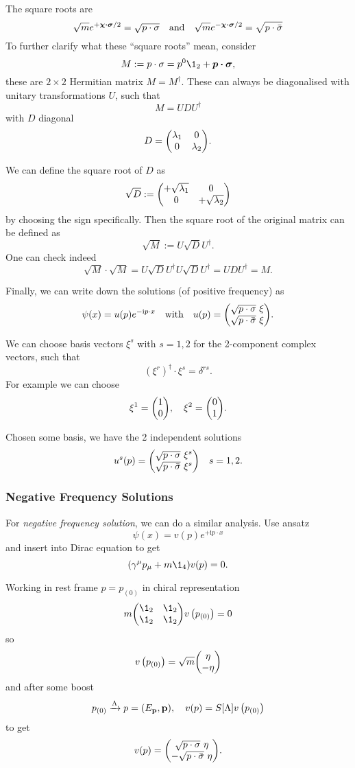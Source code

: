 \documentclass[a4paper,11pt]{article}
\begin{document}
	The square roots are
	\[
		\sqrt{m} e ^{+ \bm \chi \vdot \bm \sigma / 2} = \sqrt{p \cdot \sigma} \quad \text{and} \quad \sqrt{m} e ^{- \bm \chi \vdot \bm \sigma / 2} = \sqrt{p \cdot \bar \sigma}
	\]
	To further clarify what these ``square roots'' mean, consider
	\[
		M := p \cdot \sigma = p^0 \1_2 + \bm p \vdot \bm \sigma,
	\]
	these are $2 \times 2$ Hermitian matrix $M = M^{\dagger}$. These can always be diagonalised with unitary transformations $U$, such that 
	\[
		M = U D U^{\dagger}
	\]
	with $D$ diagonal 
	\[
		D = \mqty(\lambda_1 & 0\\ 0 & \lambda_2).
	\]
	
	We can define the square root of $D$ as 
	\[
		\sqrt{D} : = \mqty(+ \sqrt{\lambda_1} & 0 \\ 0 & + \sqrt{\lambda_2})
	\]
	by choosing the sign specifically. Then the square root of the original matrix can be defined as 
	\[
		\sqrt{M} := U \sqrt{D} U^{\dagger}.
	\]
	One can check indeed
	\[
		\sqrt{M} \cdot \sqrt{M} = U \sqrt{D} U^{\dagger} U \sqrt{D} U^{\dagger} = U D U^{\dagger} = M.
	\]
	
	Finally, we can write down the solutions (of positive frequency) as 
	\[
		\psi(x) = u(p) e ^{- \mathrm{i} p \cdot x} \quad \text{with} \quad u(p) = \mqty(\sqrt{p \cdot \sigma}\  \xi\\\sqrt{p \cdot \bar \sigma}\ \xi).
	\]
	
	We can choose basis vectors $\xi^s$ with $s = 1,2$ for the 2-component complex vectors, such that 
	\[
		(\xi^r)^{\dagger} \cdot \xi^s = \delta ^{rs}.
	\]
	For example we can choose 
	\[
		\xi^1 = \mqty(1\\0), \quad \xi^2 = \mqty(0\\1).
	\]
	
	Chosen some basis, we have the 2 independent solutions
	\[
		u^s(p) = \mqty(\sqrt{p \cdot \sigma}\ \xi^s\\\sqrt{p \cdot \bar \sigma}\ \xi^s) \quad s=1,2.
	\]

	\subsubsection{Negative Frequency Solutions}
	
	For \emph{negative frequency solution}, we can do a similar analysis. Use ansatz
	\[
		\psi(x) = v(p) e ^{+ \mathrm{i} p \cdot x}
	\]
	and insert into Dirac equation to get 
	\[
		(\gamma^\mu p_\mu + m \1_4) v(p) = 0.
	\]
	
	Working in rest frame $p = p _{(0)}$ in chiral representation 
	\[
		m \mqty(\1_2 & \1_2 \\ \1_2 & \1_2) v\left( p _{(0)} \right) = 0
	\]
	so 
	\[
		v\left( p _{(0)} \right) = \sqrt{m} \mqty(\eta \\ -\eta)
	\]
	and after some boost 
	\[
		p _{(0)} \xrightarrow{\Lambda} p = (E _{\vb p},\vb p), \quad v(p) = S[\Lambda] v\left( p _{(0)} \right)
	\]
	to get 
	\[
		v(p) = \mqty(\sqrt{p \cdot \sigma}\ \eta\\- \sqrt{p \cdot \bar \sigma}\ \eta).
	\]
\end{document}
